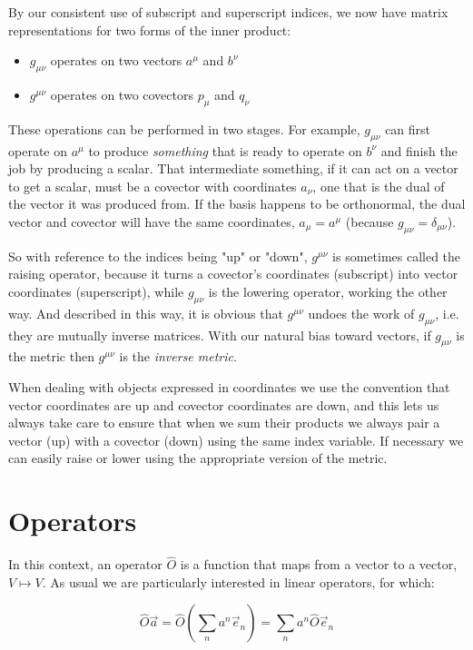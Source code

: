 By our consistent use of subscript and superscript indices, we now have matrix representations for two forms of the inner product:

\begin{itemize}
    \item $g_{\mu\nu}$ operates on two vectors $a^{\mu}$ and $b^{\nu}$
    \item $g^{\mu\nu}$ operates on two covectors $p_{\mu}$ and $q_{\nu}$
\end{itemize}

These operations can be performed in two stages. For example, $g_{\mu\nu}$ can first operate on $a^{\mu}$ to produce \textit{something} that is ready to operate on $b^{\nu}$ and finish the job by producing a scalar. That intermediate something, if it can act on a vector to get a scalar, must be a covector with coordinates $a_{\nu}$, one that is the dual of the vector it was produced from. If the basis happens to be orthonormal, the dual vector and covector will have the same coordinates, $a_{\mu} = a^{\mu}$ (because $g_{\mu\nu} = \delta_{\mu\nu}$).

So with reference to the indices being "up" or "down", $g^{\mu\nu}$ is sometimes called the raising operator, because it turns a covector's coordinates (subscript) into vector coordinates (superscript), while $g_{\mu\nu}$ is the lowering operator, working the other way. And described in this way, it is obvious that $g^{\mu\nu}$ undoes the work of $g_{\mu\nu}$, i.e. they are mutually inverse matrices. With our natural bias toward vectors, if $g_{\mu\nu}$ is the metric then $g^{\mu\nu}$ is the \textit{inverse metric}.

When dealing with objects expressed in coordinates we use the convention that vector coordinates are up and covector coordinates are down, and this lets us always take care to ensure that when we sum their products we always pair a vector (up) with a covector (down) using the same index variable. If necessary we can easily raise or lower using the appropriate version of the metric.

\section{Operators}

In this context, an operator $\hat{O}$ is a function that maps from a vector to a vector, $V \mapsto V$. As usual we are particularly interested in linear operators, for which:

$$
\hat{O} \vec{a}
=
\hat{O}\left(\sum_n a^n\vec{e}_n \right)
= 
\sum_n a^n\hat{O}\vec{e}_n
$$


